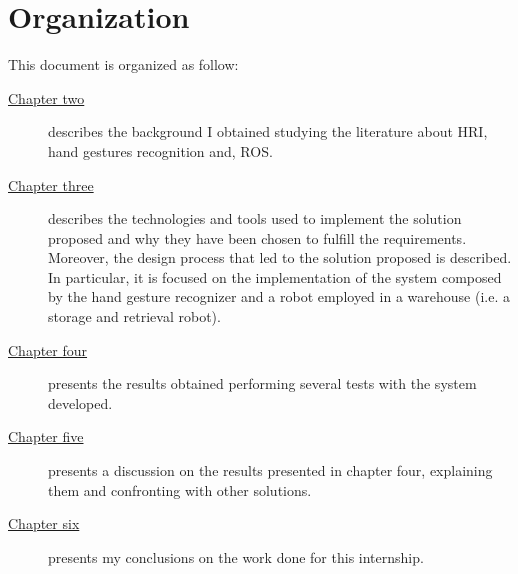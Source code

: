 \documentclass[../thesis.tex]{subfiles}
\begin{document}
\section{Organization}\label{s:organization}
This document is organized as follow:
\begin{description}
    \item[{\hyperref[cap:theory]{Chapter two}}] describes the background I obtained studying the literature about \gls{HRI}, hand gestures recognition and, \gls{ROS}.
    \item[{\hyperref[cap:methods]{Chapter three}}] describes the technologies and tools used to implement the solution proposed and why they have been chosen to fulfill the requirements. Moreover, the design process that led to the solution proposed is described. In particular, it is focused on the implementation of the system composed by the hand gesture recognizer and a robot employed in a warehouse (i.e. a storage and retrieval robot).
    \item[{\hyperref[cap:results]{Chapter four}}] presents the results obtained performing several tests with the system developed.
    \item[{\hyperref[cap:discussion]{Chapter five}}] presents a discussion on the results presented in chapter four, explaining them and confronting with other solutions.
    \item[{\hyperref[cap:conclusion]{Chapter six}}] presents my conclusions on the work done for this internship. 
\end{description}
\end{document}
